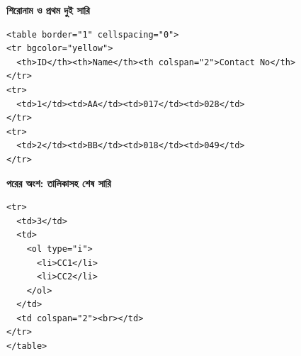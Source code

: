 \par{}\par\smallskip
\par\noindent
\begin{minipage}[t]{.48\linewidth}\vspace{0pt}\small
\textbf{\color{chFourTeal}শিরোনাম ও প্রথম দুই সারি}\par
\begin{verbatim}
<table border="1" cellspacing="0">
<tr bgcolor="yellow">
  <th>ID</th><th>Name</th><th colspan="2">Contact No</th>
</tr>
<tr>
  <td>1</td><td>AA</td><td>017</td><td>028</td>
</tr>
<tr>
  <td>2</td><td>BB</td><td>018</td><td>049</td>
</tr>
\end{verbatim}
\end{minipage}\hfill
\begin{minipage}[t]{.48\linewidth}\vspace{0pt}\small
\textbf{\color{chFourTeal}পরের অংশ: তালিকাসহ শেষ সারি}\par
\begin{verbatim}
<tr>
  <td>3</td>
  <td>
    <ol type="i">
      <li>CC1</li>
      <li>CC2</li>
    </ol>
  </td>
  <td colspan="2"><br></td>
</tr>
</table>
\end{verbatim}
\end{minipage}\par\smallskip

\smallskip


